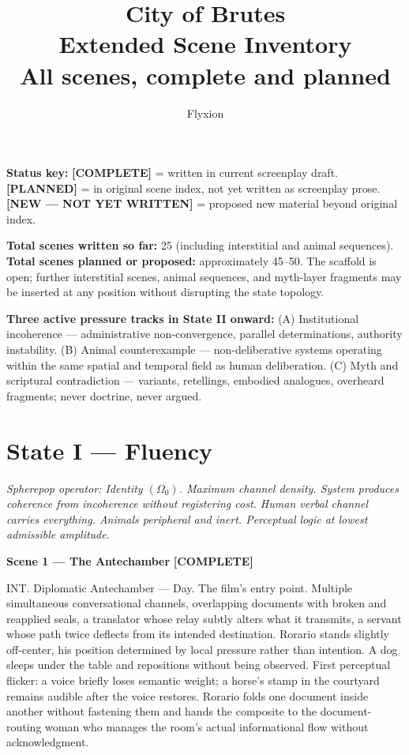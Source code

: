 \documentclass[12pt, oneside]{amsart}
\title{\textbf{City of Brutes}\\[0.4em]
\large Extended Scene Inventory\\[0.2em]
\normalsize All scenes, complete and planned}
\author{Flyxion}
\date{}
\newcommand{\statuscomplete}{{\small\bfseries\color{complete}[COMPLETE]}}
\begin{document}
\maketitle
\thispagestyle{empty}

\noindent\textbf{Status key:} {\color{complete}\textbf{[COMPLETE]}} = written in current screenplay draft. {\color{planned}\textbf{[PLANNED]}} = in original scene index, not yet written as screenplay prose. {\color{newscene}\textbf{[NEW --- NOT YET WRITTEN]}} = proposed new material beyond original index.

\bigskip
\noindent\textbf{Total scenes written so far:} 25 (including interstitial and animal sequences). \textbf{Total scenes planned or proposed:} approximately 45--50. The scaffold is open; further interstitial scenes, animal sequences, and myth-layer fragments may be inserted at any position without disrupting the state topology.

\bigskip
\noindent\textbf{Three active pressure tracks in State II onward:}
(A) Institutional incoherence --- administrative non-convergence, parallel determinations, authority instability.
(B) Animal counterexample --- non-deliberative systems operating within the same spatial and temporal field as human deliberation.
(C) Myth and scriptural contradiction --- variants, retellings, embodied analogues, overheard fragments; never doctrine, never argued.

\section{State I — Fluency}

\noindent\textit{Spherepop operator: Identity $(\Omega_0)$. Maximum channel density. System produces coherence from incoherence without registering cost. Human verbal channel carries everything. Animals peripheral and inert. Perceptual logic at lowest admissible amplitude.}

\bigskip

\noindent\textbf{Scene 1 — The Antechamber} \statuscomplete

\noindent INT. Diplomatic Antechamber --- Day. The film's entry point. Multiple simultaneous conversational channels, overlapping documents with broken and reapplied seals, a translator whose relay subtly alters what it transmits, a servant whose path twice deflects from its intended destination. Rorario stands slightly off-center, his position determined by local pressure rather than intention. A dog sleeps under the table and repositions without being observed. First perceptual flicker: a voice briefly loses semantic weight; a horse's stamp in the courtyard remains audible after the voice restores. Rorario folds one document inside another without fastening them and hands the composite to the document-routing woman who manages the room's actual informational flow without acknowledgment.
\end{document}

